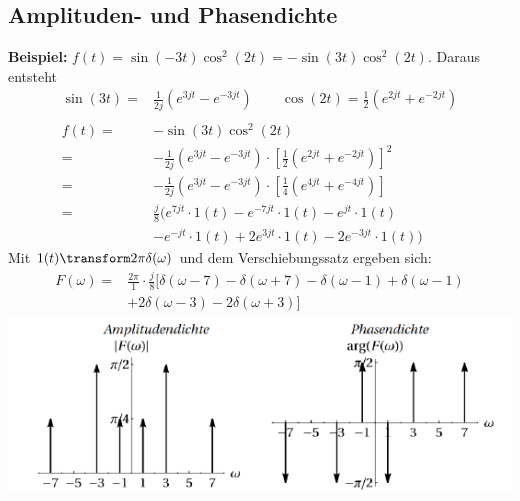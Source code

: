 \subsection{Amplituden- und Phasendichte}
\textbf{Beispiel:} $f(t) = \sin(-3t)\cos^2(2t) = -\sin(3t)\cos^2(2t)$. Daraus entsteht
\begin{align*}
	\sin(3t) =& \frac{1}{2j}\left(e^{3jt} - e^{-3jt}\right) \qquad \cos(2t) = \frac{1}{2}\left(e^{2jt} + e^{-2jt}\right) \\ \\
	f(t) =& -\sin(3t)\cos^2(2t) \\
	=&-\frac{1}{2j}\left(e^{3jt} - e^{-3jt}\right)\cdot \left[\frac{1}{2}\left(e^{2jt} + e^{-2jt}\right)\right]^2\\
	=&-\frac{1}{2j}\left(e^{3jt} - e^{-3jt}\right)\cdot \left[\frac{1}{4}\left(e^{4jt} + e^{-4jt}\right)\right]\\
	=& \frac{j}{8}(e^{7jt}\cdot1(t)-e^{-7jt}\cdot1(t)-e^{jt}\cdot1(t)\\
	&-e^{-jt}\cdot1(t)+2e^{3jt}\cdot1(t)-2e^{-3jt}\cdot1(t))
\end{align*}
Mit $1(t) \transform 2\pi\delta(\omega)$ und dem Verschiebungssatz ergeben sich:
\begin{align*}
	F(\omega) =& \frac{2\pi}{1}\cdot\frac{j}{8}[\delta(\omega - 7)-\delta(\omega + 7) - \delta(\omega - 1)+\delta(\omega - 1)\\
	&+2\delta(\omega - 3) -2\delta(\omega +3)]
\end{align*}
\includegraphics[width=\columnwidth]{Images/screenshot001}
